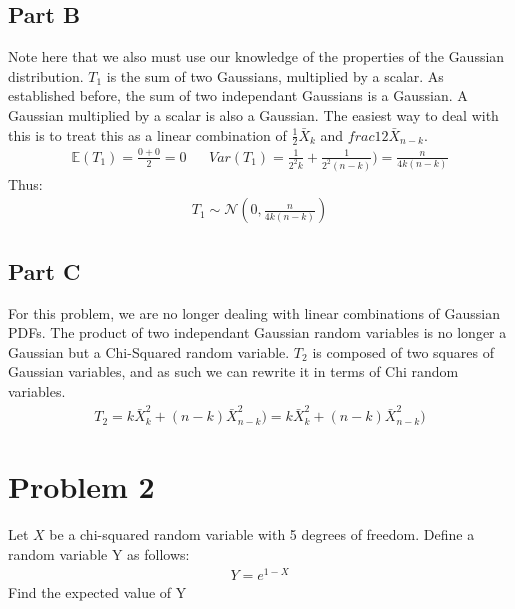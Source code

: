 \documentclass{article}
\begin{document}
\subsection*{Part B}
Note here that we also must use our knowledge of the properties of the Gaussian distribution. $T_1$ is the sum of two Gaussians, multiplied by a scalar. As established before, the sum of two independant Gaussians is a Gaussian. A Gaussian multiplied by a scalar is also a Gaussian. The easiest way to deal with this is to treat this as a linear combination of $\frac{1}{2}\bar{X}_k$ and $frac{1}{2}\bar{X}_{n-k}$.
\begin{align*}
\mathbb{E}(T_1) = \frac{0+0}{2} = 0 && Var(T_1) = \frac{1}{2^2k} + \frac{1}{2^2(n-k)}) = \frac{n}{4k(n-k)}
\end{align*}
Thus:
\begin{align*}
\boxed{ T_1 \sim \mathcal{N}(0,\tfrac{n}{4k(n-k)}) }
\end{align*}
\subsection*{Part C}
For this problem, we are no longer dealing with linear combinations of Gaussian PDFs. The product of two independant Gaussian random variables is no longer a Gaussian but a Chi-Squared random variable. $T_2$ is composed of two squares of Gaussian variables, and as such we can rewrite it in terms of Chi random variables.
\begin{align*}
T_2 = k\bar{X}_{k}^2 + (n-k) \bar{X}_{n-k}^{2}) = k\bar{X}_{k}^2 + (n-k) \bar{X}_{n-k}^{2})
\end{align*}


\clearpage

\section*{Problem 2}
Let $X$ be a chi-squared random variable with 5 degrees of freedom. Define a random
variable Y as follows:
\begin{align*}
Y = e^{1-X}
\end{align*}
Find the expected value of Y
\end{document}
